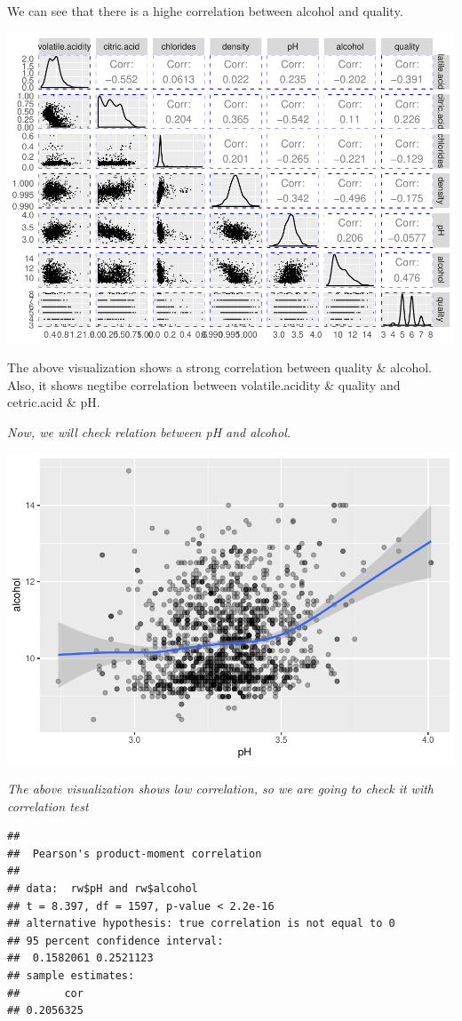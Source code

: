 \documentclass[]{article}
\begin{document}
We can see that there is a highe correlation between alcohol and
quality.

\includegraphics{RedWine_files/figure-latex/Correlations_Diagram-1.pdf}

The above visualization shows a strong correlation between quality \&
alcohol. Also, it shows negtibe correlation between volatile.acidity \&
quality and cetric.acid \& pH.

\emph{Now, we will check relation between pH and alcohol.}

\includegraphics{RedWine_files/figure-latex/Correlation_Diagram-1.pdf}

\emph{The above visualization shows low correlation, so we are going to
check it with correlation test}

\begin{verbatim}
## 
##  Pearson's product-moment correlation
## 
## data:  rw$pH and rw$alcohol
## t = 8.397, df = 1597, p-value < 2.2e-16
## alternative hypothesis: true correlation is not equal to 0
## 95 percent confidence interval:
##  0.1582061 0.2521123
## sample estimates:
##       cor 
## 0.2056325
\end{verbatim}
\end{document}
